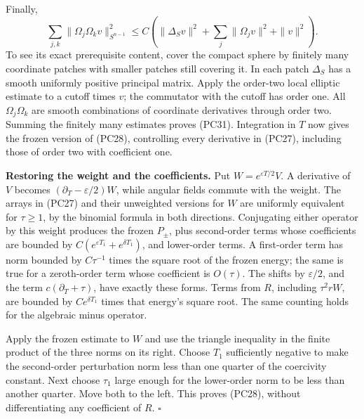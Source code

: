 \documentclass[
  11pt,
]{article}
\makeatletter
\let\ReaderOriginalAnchorStart\hyper@anchorstart
\let\ReaderOriginalAnchorEnd\hyper@anchorend
\let\ReaderPendingAliases\@empty
\def\ReaderArmAliases#1{\gdef\ReaderPendingAliases{#1}}
\def\hyper@anchorstart#1{\ReaderIfNativeAnchorTF{#1}{\ReaderPendingAliases\global\let\ReaderPendingAliases\@empty}{}\ReaderOriginalAnchorStart{#1}}
\makeatother
\begin{document}
Finally, \[
\sum_{j,k}\|\Omega_j\Omega_kv\|_{S^{n-1}}^2
\leq C\left(\|\Delta_Sv\|^2+\sum_j\|\Omega_jv\|^2+\|v\|^2\right).
\tag{PC31}
\] To see its exact prerequisite content, cover the compact sphere by
finitely many coordinate patches with smaller patches still covering it.
In each patch \(\Delta_S\) has a smooth uniformly positive principal
matrix. Apply the order-two local elliptic estimate to a cutoff times
\(v\); the commutator with the cutoff has order one. All
\(\Omega_j\Omega_k\) are smooth combinations of coordinate derivatives
through order two. Summing the finitely many estimates proves (PC31).
Integration in \(T\) now gives the frozen version of (PC28), controlling
every derivative in (PC27), including those of order two with
coefficient one.

\textbf{Restoring the weight and the coefficients.} Put
\(W=e^{\varepsilon T/2}V\). A derivative of \(V\) becomes
\((\partial_T-\varepsilon/2)W\), while angular fields commute with the
weight. The arrays in (PC27) and their unweighted versions for \(W\) are
uniformly equivalent for \(\tau\geq1\), by the binomial formula in both
directions. Conjugating either operator by this weight produces the
frozen \(P_\pm\), plus second-order terms whose coefficients are bounded
by \(C(e^{\varepsilon T_1}+e^{\delta T_1})\), and lower-order terms. A
first-order term has norm bounded by \(C\tau^{-1}\) times the square
root of the frozen energy; the same is true for a zeroth-order term
whose coefficient is \(O(\tau)\). The shifts by \(\varepsilon/2\), and
the term \(c(\partial_T+\tau)\), have exactly these forms. Terms from
\(R\), including \(\tau^2rW\), are bounded by \(Ce^{\delta T_1}\) times
that energy's square root. The same counting holds for the algebraic
minus operator.

Apply the frozen estimate to \(W\) and use the triangle inequality in
the finite product of the three norms on its right. Choose \(T_1\)
sufficiently negative to make the second-order perturbation norm less
than one quarter of the coercivity constant. Next choose \(\tau_1\)
large enough for the lower-order norm to be less than another quarter.
Move both to the left. This proves (PC28), without differentiating any
coefficient of \(R\). \(\square\)

\ReaderArmAliases{\ReaderOriginalAnchorStart{AN03-PCU-006}\ReaderOriginalAnchorEnd\begingroup\expandafter\def\csname @currentHref\endcsname{AN03-PCU-006}\label{AN03-PCU-006}\endgroup\ReaderOriginalAnchorStart{an03-pcu-006-reversal-produces-angular-positivity-with-first-derivatives-only}\ReaderOriginalAnchorEnd\begingroup\expandafter\def\csname @currentHref\endcsname{an03-pcu-006-reversal-produces-angular-positivity-with-first-derivatives-only}\label{an03-pcu-006-reversal-produces-angular-positivity-with-first-derivatives-only}\endgroup\ReaderOriginalAnchorStart{6-reversal-produces-angular-positivity-with-first-derivatives-only}\ReaderOriginalAnchorEnd\begingroup\expandafter\def\csname @currentHref\endcsname{6-reversal-produces-angular-positivity-with-first-derivatives-only}\label{6-reversal-produces-angular-positivity-with-first-derivatives-only}\endgroup\ReaderOriginalAnchorStart{reversal-produces-angular-positivity-with-first-derivatives-only}\ReaderOriginalAnchorEnd}
\end{document}
